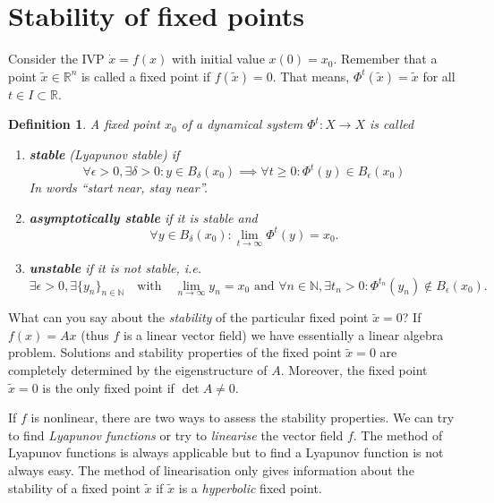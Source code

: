 \documentclass[hidelinks,a4paper, 11pt]{article}
\theoremstyle{plain}
\theoremstyle{break}
\theoremstyle{plain}
\newtheorem{definition}[theorem]{Definition}
\theoremstyle{definition}
\begin{document}
\section{Stability of fixed points}

Consider the IVP $\dot x = f(x)$ with initial value $x(0) = x_0$. Remember that a point $\tilde x \in \mathbb R^n$ is called a fixed point if $f(\tilde x) = 0$. That means, $\Phi^t(\tilde x ) = \tilde x$ for all $t \in I \subset \mathbb R$. 

\begin{definition}
	A fixed point $x_0$ of a dynamical system $\Phi^t: X \to X$ is called 
	\begin{enumerate}
		\item \textbf{stable} (Lyapunov stable) if 
		\[
		\forall \epsilon > 0, \exists \delta > 0: y \in B_{\delta}(x_0) \implies \forall t \geq 0: \Phi^t(y) \in B_{\epsilon}(x_0)
		\]
		In words \textit{``start near, stay near''}.
		
		\item \textbf{asymptotically stable} if it is stable and $$\forall y \in B_{\delta}(x_0): \lim_{t \to \infty} \Phi^t(y) = x_0.$$
		
		\item \textbf{unstable} if it is not stable, i.e.
		\[
		\exists \epsilon > 0, \exists \{ y_n \}_{n \in \mathbb N} \quad \text{with} \quad \lim_{n \to \infty}y_n = x_0 \text{ and } \forall n \in \mathbb N, \exists t_n > 0: \Phi^{t_n}(y_n) \notin B_{\epsilon}(x_0).
		\]
	\end{enumerate}
\end{definition}

What can you say about the \emph{stability} of the particular fixed point $\tilde x=0$? If $f(x) = Ax$ (thus $f$ is a linear vector field) we have essentially a linear algebra problem. Solutions and stability properties of the fixed point $\tilde x = 0$ are completely determined by the eigenstructure of $A$. Moreover, the fixed point $\tilde x = 0$ is the only fixed point if $\det A \neq 0$.

If $f$ is nonlinear, there are two ways to assess the stability properties. We can try to find \emph{Lyapunov functions} or try to \emph{linearise} the vector field $f$. The method of Lyapunov functions is always applicable but to find a Lyapunov function is not always easy. The method of linearisation only gives information about the stability of a fixed point $\tilde x$ if $\tilde x$ is a \emph{hyperbolic} fixed point.
\end{document}
